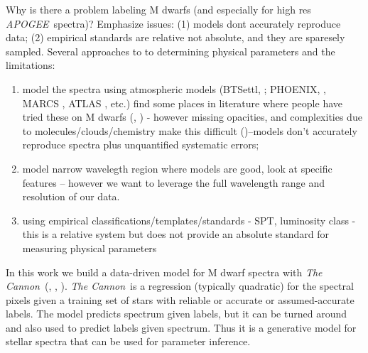 \documentclass[modern]{aastex62}
\newcommand{\apogee}{\textsl{APOGEE}}
\newcommand{\thecannon}{\textsl{The Cannon}}
\begin{document}
Why is there a problem labeling M dwarfs (and especially for high res \apogee\ spectra)? Emphasize issues: (1) models dont accurately reproduce data; (2) empirical standards are relative not absolute, and they are sparesely sampled. Several approaches to to determining physical parameters and the limitations:

\begin{enumerate}
\item model the spectra using atmospheric models (BTSettl, \citealt{Allard:2011}; PHOENIX, \citealt{Husser:2013}, MARCS \citealt{Gustafsson:2008}, ATLAS \citealt{Castelli:2004}, etc.) find some places in literature where people have tried these on M dwarfs (\citealt{Rajpurohit:2014}, \citealt{Rajpurohit:2018}) - however missing opacities, and complexities due to molecules/clouds/chemistry make this difficult (\citealt{Allard:2013})--models don't accurately reproduce spectra plus unquantified systematic errors; 

\item model narrow wavelegth region where models are good, look at specific features -- however we want to leverage the full wavelength range and resolution of our data.

\item using empirical classifications/templates/standards - SPT, luminosity class - this is a relative system but does not provide an absolute standard for measuring physical parameters
\end{enumerate}

In this work we build a data-driven model for M dwarf spectra with \thecannon\ (\citealt{Ness:2015}, \citealt{Ho:2017a}, \citealt{Casey:2016}).
\thecannon\ is a regression (typically quadratic) for the spectral pixels given a training
set of stars with reliable or accurate or assumed-accurate labels.
The model predicts spectrum given labels, but it can be turned around and also
used to predict labels given spectrum.
Thus it is a generative model for stellar spectra that can be used for parameter inference.
\end{document}

